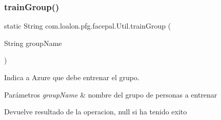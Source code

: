\subsubsection{\texorpdfstring{train\+Group()}{trainGroup()}}
{\footnotesize\ttfamily static String com.\+loalon.\+pfg.\+facepal.\+Util.\+train\+Group (\begin{DoxyParamCaption}\item[{String}]{group\+Name }\end{DoxyParamCaption})\hspace{0.3cm}{\ttfamily [static]}}



Indica a Azure que debe entrenar el grupo. 


\begin{DoxyParams}{Parámetros}
{\em group\+Name} & nombre del grupo de personas a entrenar \\
\hline
\end{DoxyParams}
\begin{DoxyReturn}{Devuelve}
resultado de la operacion, null si ha tenido exito 
\end{DoxyReturn}
